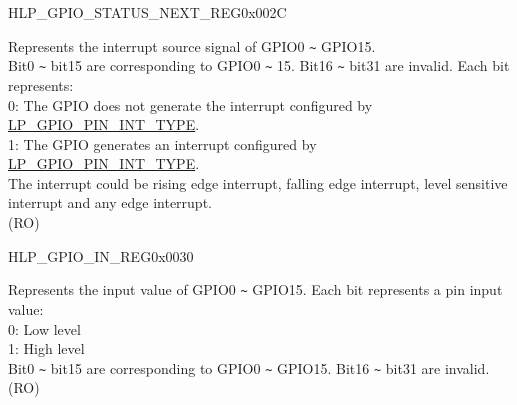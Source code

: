 \begin{register}{H}{LP\_GPIO\_STATUS\_NEXT\_REG}{0x002C}\label{regdesc:LPGPIOSTATUSNEXTREG}
%
%
\regnewline%
\begin{regdesc}\begin{reglist}
\label{fielddesc:LPGPIOSTATUSINTERRUPTNEXT}\item [LP\_GPIO\_STATUS\_INTERRUPT\_NEXT] Represents the interrupt source signal of GPIO0 \verb+~+ GPIO15.\\
Bit0 \verb+~+ bit15 are corresponding to GPIO0 \verb+~+ 15. Bit16 \verb+~+ bit31 are invalid. Each bit represents:\\
0: The GPIO does not generate the interrupt configured by \hyperref[fielddesc:LPGPIOPINNINTTYPE]{LP\_GPIO\_PIN\_INT\_TYPE}.\\
1: The GPIO generates an interrupt configured by \hyperref[fielddesc:LPGPIOPINNINTTYPE]{LP\_GPIO\_PIN\_INT\_TYPE}.\\
The interrupt could be rising edge interrupt, falling edge interrupt, level sensitive interrupt and any edge interrupt.\\  (RO)
\end{reglist}\end{regdesc}
\end{register}


\begin{register}{H}{LP\_GPIO\_IN\_REG}{0x0030}\label{regdesc:LPGPIOINREG}
%
%
\regnewline%
\begin{regdesc}\begin{reglist}
\label{fielddesc:LPGPIOINDATANEXT}\item [LP\_GPIO\_IN\_DATA\_NEXT]  Represents the input value of GPIO0 \verb+~+ GPIO15. Each bit represents a pin input value:\\
0: Low level\\
1: High level\\
Bit0 \verb+~+ bit15 are corresponding to GPIO0 \verb+~+ GPIO15. Bit16 \verb+~+ bit31 are invalid.\\
(RO)
\end{reglist}\end{regdesc}
\end{register}


